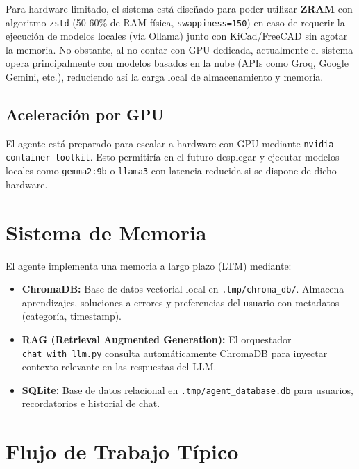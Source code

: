 \documentclass[12pt, a4paper]{article}
\begin{document}
Para hardware limitado, el sistema está diseñado para poder utilizar \textbf{ZRAM} con algoritmo \texttt{zstd} (50-60\% de RAM física, \texttt{swappiness=150}) en caso de requerir la ejecución de modelos locales (vía Ollama) junto con KiCad/FreeCAD sin agotar la memoria. No obstante, al no contar con GPU dedicada, actualmente el sistema opera principalmente con modelos basados en la nube (APIs como Groq, Google Gemini, etc.), reduciendo así la carga local de almacenamiento y memoria.

\subsection{Aceleración por GPU}

El agente está preparado para escalar a hardware con GPU mediante \texttt{nvidia-container-toolkit}. Esto permitiría en el futuro desplegar y ejecutar modelos locales como \texttt{gemma2:9b} o \texttt{llama3} con latencia reducida si se dispone de dicho hardware.

\section{Sistema de Memoria}

El agente implementa una memoria a largo plazo (LTM) mediante:

\begin{itemize}[leftmargin=*]
    \item \textbf{ChromaDB:} Base de datos vectorial local en \texttt{.tmp/chroma\_db/}. Almacena aprendizajes, soluciones a errores y preferencias del usuario con metadatos (categoría, timestamp).
    \item \textbf{RAG (Retrieval Augmented Generation):} El orquestador \texttt{chat\_with\_llm.py} consulta automáticamente ChromaDB para inyectar contexto relevante en las respuestas del LLM.
    \item \textbf{SQLite:} Base de datos relacional en \texttt{.tmp/agent\_database.db} para usuarios, recordatorios e historial de chat.
\end{itemize}

\section{Flujo de Trabajo Típico}
\end{document}
